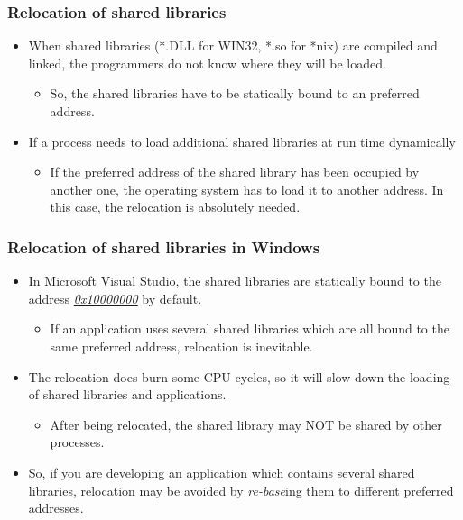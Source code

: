 \documentclass[CJKutf8,dvipsnames,table]{beamer}
\begin{document}
\begin{CJK*}{UTF8}{song}
  \begin{frame}
    \frametitle{Relocation of shared libraries} \pause
    \begin{itemize}
    \item When shared libraries (*.DLL for WIN32, *.so for *nix) are compiled and linked, the programmers do not know where they will be loaded.  \pause
      \begin{itemize}
      \item So, the shared libraries have to be statically bound to an preferred address.  \pause
      \end{itemize}
    \item If a process needs to load additional shared libraries at run time dynamically  \pause
      \begin{itemize}
      \item If the preferred address of the shared library has been occupied by another one, the operating system has to load it to another address. In this case, the relocation is absolutely needed. 
      \end{itemize}
    \end{itemize}
  \end{frame}

  
  \begin{frame}
    \frametitle{Relocation of shared libraries in Windows} \pause
    \begin{itemize}
    \item In Microsoft Visual Studio, the shared libraries are statically bound to the address \href{https://blogs.msdn.microsoft.com/oldnewthing/20121227-00/?p=5713/}{\emph{0x10000000}} by default.  \pause
      \begin{itemize}
      \item If an application uses several shared libraries which are all bound to the same preferred address, relocation is inevitable.  \pause
      \end{itemize}
    \item The relocation does burn some CPU cycles, so it will slow down the loading of shared libraries and applications.  \pause
      \begin{itemize}
      \item After being relocated, the shared library may NOT be shared by other processes.  \pause
      \end{itemize}
    \item So, if you are developing an application which contains several shared libraries, relocation may be avoided by \emph{re-base}ing them to different preferred addresses. 
    \end{itemize}
  \end{frame}
  

\end{CJK*}
\end{document}
